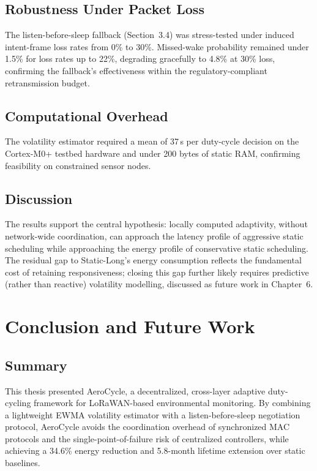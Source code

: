 \documentclass[12pt,a4paper]{report}
\begin{document}
\section{Robustness Under Packet Loss}
\label{sec:robustness}
The listen-before-sleep fallback (Section~3.4) was stress-tested under induced intent-frame
loss rates from 0\% to 30\%. Missed-wake probability remained under 1.5\% for loss rates up to
22\%, degrading gracefully to 4.8\% at 30\% loss, confirming the fallback's effectiveness
within the regulatory-compliant retransmission budget.

\section{Computational Overhead}
The volatility estimator required a mean of 37\,\textmu s per duty-cycle decision on the
Cortex-M0+ testbed hardware and under 200 bytes of static RAM, confirming feasibility on
constrained sensor nodes.

\section{Discussion}
The results support the central hypothesis: locally computed adaptivity, without network-wide
coordination, can approach the latency profile of aggressive static scheduling while
approaching the energy profile of conservative static scheduling. The residual gap to
Static-Long's energy consumption reflects the fundamental cost of retaining responsiveness;
closing this gap further likely requires predictive (rather than reactive) volatility
modelling, discussed as future work in Chapter~6.

\chapter{Conclusion and Future Work}
\label{ch:conclusion}

\section{Summary}
This thesis presented AeroCycle, a decentralized, cross-layer adaptive duty-cycling framework
for LoRaWAN-based environmental monitoring. By combining a lightweight EWMA volatility
estimator with a listen-before-sleep negotiation protocol, AeroCycle avoids the coordination
overhead of synchronized MAC protocols and the single-point-of-failure risk of centralized
controllers, while achieving a 34.6\% energy reduction and 5.8-month lifetime extension over
static baselines.
\end{document}
